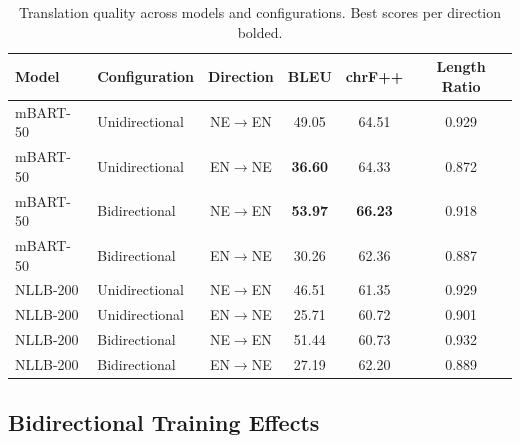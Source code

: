 \documentclass[manuscript, screen, review]{acmart}
\begin{document}
\begin{table}[t]
  \caption{Translation quality across models and configurations. Best scores per direction bolded.}
  \label{tab:main_results}
  \begin{tabular}{llcccc}
    \toprule
    \textbf{Model} & \textbf{Configuration} & \textbf{Direction} & \textbf{BLEU} & \textbf{chrF++} & \textbf{Length Ratio} \\
    \midrule
    mBART-50 & Unidirectional & NE$\rightarrow$EN & 49.05 & 64.51 & 0.929 \\
    mBART-50 & Unidirectional & EN$\rightarrow$NE & \textbf{36.60} & 64.33 & 0.872 \\
    mBART-50 & Bidirectional & NE$\rightarrow$EN & \textbf{53.97} & \textbf{66.23} & 0.918 \\
    mBART-50 & Bidirectional & EN$\rightarrow$NE & 30.26 & 62.36 & 0.887 \\
    \midrule
    NLLB-200 & Unidirectional & NE$\rightarrow$EN & 46.51 & 61.35 & 0.929 \\
    NLLB-200 & Unidirectional & EN$\rightarrow$NE & 25.71 & 60.72 & 0.901 \\
    NLLB-200 & Bidirectional & NE$\rightarrow$EN & 51.44 & 60.73 & 0.932 \\
    NLLB-200 & Bidirectional & EN$\rightarrow$NE & 27.19 & 62.20 & 0.889 \\
    \bottomrule
  \end{tabular}
\end{table}


\subsection{Bidirectional Training Effects}
\label{subsec:bidir_effects}
\end{document}
